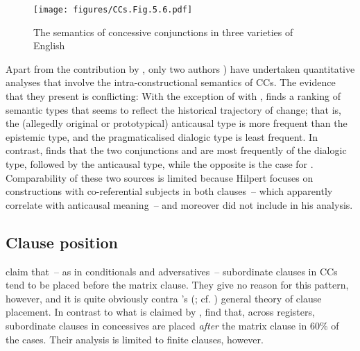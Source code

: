 \begin{figure}
\texttt{[image: figures/CCs.Fig.5.6.pdf]}
\caption{\label{bkm:Ref35585846}\label{fig:5.6}The semantics of concessive conjunctions in three varieties of English \citep{Schützler2017}}
 \end{figure}

Apart from the contribution by \citet{Mondorf2004}, only two  authors \citealt{Hilpert2013a,Schützler2017,Schützler2018b}) have undertaken quantitative analyses that involve the intra-constructional semantics of CCs. The evidence that they present is conflicting: With the exception of  with , \citet{Hilpert2013a} finds a ranking of semantic types that seems to reflect the historical trajectory of change; that is, the (allegedly original or prototypical) anticausal type is more frequent than the epistemic type, and the pragmaticalised dialogic type is least frequent. In contrast, \citet{Schützler2017, Schützler2018b} finds that the two conjunctions  and  are most frequently of the dialogic type, followed by the anticausal type, while the opposite is the case for . Comparability of these two sources is limited because Hilpert focuses on constructions with co-referential subjects in both clauses~– which apparently correlate with anticausal meaning~– and moreover did not include  in his analysis.

\subsection{\label{bkm:Ref35532447}Clause position}\label{sec:5.1.3}

\citet[1088]{QuirkEtAl1985} claim that~– as in conditionals and adversatives~– subordinate clauses in CCs tend to be placed before the matrix clause. They give no reason for this pattern, however, and it is quite obviously contra \citeauthor{Diessel2005}’s (\citeyear{Diessel2005}; cf. ) general theory of clause placement. In contrast to what is claimed by \citet[1088]{QuirkEtAl1985}, \citet[834]{BiberEtAl1999} find that, across registers, subordinate clauses in concessives are placed \textit{after} the matrix clause in 60\% of the cases. Their analysis is limited to finite clauses, however.

